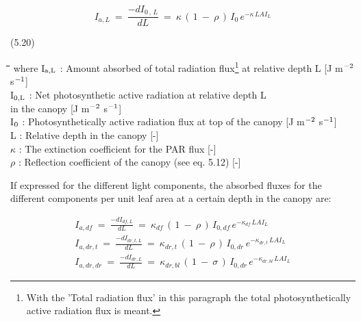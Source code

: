 \begin{displaymath}
I _{a,L} ~=~{\frac{-dI _{0\, ,\, L} }{dL}} ~=~ \kappa \, (\, 1~-~ \rho \, )\, I _{0} \, e ^{- \kappa \, LAI _{L} }
\end{displaymath}

 
\strut\hfill (5.20)

\nwln
\begin{tabbing}
\hspace{1.27cm}\=\hspace{1.27cm}\=\hspace{1.27cm}\=\hspace{1.27cm}\=%
\hspace{1.27cm}\=\hspace{1.27cm}\=\hspace{1.27cm}\=\hspace{1.27cm}\=%
\hspace{1.27cm}\=\hspace{1.27cm}\=\kill
where I$_{{\rm a,L}}$ : Amount absorbed of total radia\-tion flux\footnote{With the 'Total radiation flux' in this paragraph the total photosyntheti\-cally active radiation flux is meant.} at relative depth L        [J m$^{{\rm -2}}$ s$^{{\rm -1}}$]\\
I$_{{\rm 0,L}}$ : Net photosynthetic active radiation at relative depth L \\
   in the canopy        [J m$^{{\rm -2}}$ s$^{{\rm -1}}$]\\
I$_{{\rm 0}}$ : Photosynthetically active radia\-tion flux at top of the canopy        [J m$^{{\rm -2}}$ s$^{{\rm -1}}$]\\
L : Relative depth in the canopy        [-]\\
$\kappa$ : The extinction coefficient for the PAR flux         [-]\\
$\rho$ : Reflection coefficient of the canopy (see eq. 5.12)        [-]
\end{tabbing}






 If expressed for the different light components, the absorbed fluxes for the different
components per unit leaf area at a certain depth in the canopy are:

\begin{eqnarray*}
I _{a,df} ~=~{\frac{-dI _{df,L} }{dL}} ~=~ \kappa _{df} \, (\, 1~-~ \rho \, )\, I _{0,df} \, e ^{- \kappa _{df} \, LAI _{L} } \nonumber  \\
I _{a,dr,t} ~=~{\frac{-dI _{dr,t,L} }{dL}} ~=~ \kappa _{dr,t} \, (\, 1~-~ \rho \, )\, I _{0,dr} \, e ^{- \kappa _{dr,t} \, LAI _{L} } \nonumber  \\
I _{a,dr,dr} ~=~{\frac{-dI _{dr,L} }{dL}} ~=~ \kappa _{dr,bl} \, (\, 1~-~ \sigma \, )\, I _{0,dr} \, e ^{- \kappa _{dr,bl} \, LAI _{L} }
\end{eqnarray*}

